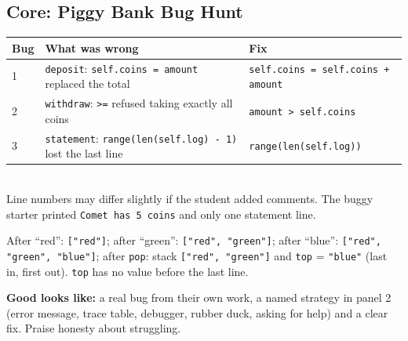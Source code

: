 \subsection{Core: Piggy Bank Bug Hunt}
\begin{answer}
\begin{tabular}{@{}p{0.9cm}p{7.1cm}p{5.5cm}@{}}
\toprule
Bug & What was wrong & Fix \\ \midrule
1 & \texttt{deposit}: \texttt{self.coins = amount} replaced the total & \texttt{self.coins = self.coins + amount} \\
2 & \texttt{withdraw}: \texttt{>=} refused taking exactly all coins & \texttt{amount > self.coins} \\
3 & \texttt{statement}: \texttt{range(len(self.log) - 1)} lost the last line & \texttt{range(len(self.log))} \\
\bottomrule
\end{tabular}\\[4pt]
Line numbers may differ slightly if the student added comments. The buggy starter printed \texttt{Comet has 5 coins} and only one statement line.
\end{answer}

\begin{answer}
After \enquote{red}: \texttt{["red"]}; after \enquote{green}: \texttt{["red", "green"]}; after \enquote{blue}: \texttt{["red", "green", "blue"]}; after \texttt{pop}: stack \texttt{["red", "green"]} and \texttt{top} = \texttt{"blue"} (last in, first out). \texttt{top} has no value before the last line.
\end{answer}

\begin{answer}
\textbf{Good looks like:} a real bug from their own work, a named strategy in panel 2 (error message, trace table, debugger, rubber duck, asking for help) and a clear fix. Praise honesty about struggling.
\end{answer}
